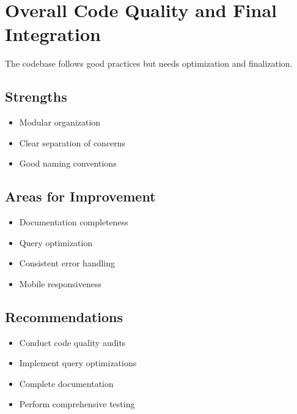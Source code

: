 \section{Overall Code Quality and Final Integration}

\begin{tcolorbox}[
    enhanced,
    title={~75\% Complete},
    attach boxed title to top left,
    boxed title style={
        colback=primary!50,
        colframe=primary!50,
        arc=0mm,
    },
    colback=white,
    colframe=primary!50,
    arc=0mm,
    fonttitle=\bfseries
]
    The codebase follows good practices but needs optimization and finalization.
\end{tcolorbox}

\subsection{Strengths}
\begin{itemize}
    \item Modular organization
    \item Clear separation of concerns
    \item Good naming conventions
\end{itemize}

\subsection{Areas for Improvement}
\begin{itemize}
    \item Documentation completeness
    \item Query optimization
    \item Consistent error handling
    \item Mobile responsiveness
\end{itemize}

\subsection{Recommendations}
\begin{itemize}
    \item Conduct code quality audits
    \item Implement query optimizations
    \item Complete documentation
    \item Perform comprehensive testing
\end{itemize}
